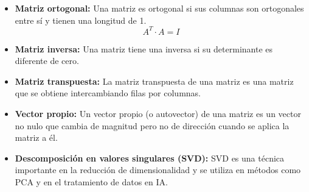 \documentclass{templateApunte}
\begin{document}
\begin{itemize}
\begin{itemize}
\begin{itemize}
      \item \textbf{Matriz ortogonal:} Una matriz es ortogonal si sus columnas son ortogonales entre sí y tienen una longitud de 1.
      \begin{equation*}
        A^T \cdot A = I
      \end{equation*}

      \item \textbf{Matriz inversa:} Una matriz tiene una inversa si su determinante es diferente de cero.
      
      \item \textbf{Matriz transpuesta:} La matriz transpuesta de una matriz es una matriz que se obtiene intercambiando filas por columnas.

      \item \textbf{Vector propio:} Un vector propio (o autovector) de una matriz es un vector no nulo que cambia de magnitud pero no de dirección cuando se aplica la matriz a él.
      
      \item \textbf{Descomposición en valores singulares (SVD):} SVD es una técnica importante en la reducción de dimensionalidad y se utiliza en métodos como PCA y en el tratamiento de datos en IA.
      

\end{itemize}
\end{itemize}
\end{itemize}
\end{document}
